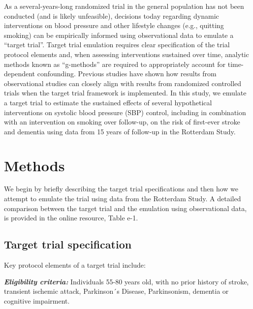 \documentclass[
]{book}
\begin{document}
As a several-years-long randomized trial in the general population has not been conducted (and is likely unfeasible), decisions today regarding dynamic interventions on blood pressure and other lifestyle changes (e.g., quitting smoking) can be empirically informed using observational data to emulate a ``target trial''\autocite{zhang2018,taubman2009,jain2016,danaei2018,garcia_aymerich2014}. Target trial emulation requires clear specification of the trial protocol elements and, when assessing interventions sustained over time, analytic methods known as ``g-methods'' are required to appropriately account for time-dependent confounding\autocite{whatif2020}. Previous studies have shown how results from observational studies can closely align with results from randomized controlled trials when the target trial framework is implemented\autocite{lodi2019,hernan2008}. In this study, we emulate a target trial to estimate the sustained effects of several hypothetical interventions on systolic blood pressure (SBP) control, including in combination with an intervention on smoking over follow-up, on the risk of first-ever stroke and dementia using data from 15 years of follow-up in the Rotterdam Study.

\hypertarget{methods-1}{%
\section{Methods}\label{methods-1}}

We begin by briefly describing the target trial specifications and then how we attempt to emulate the trial using data from the Rotterdam Study. A detailed comparison between the target trial and the emulation using observational data, is provided in the online resource, Table e-1.

\hypertarget{target-trial-specification}{%
\subsection{Target trial specification}\label{target-trial-specification}}

Key protocol elements of a target trial include:

\textbf{\emph{Eligibility criteria:}} Individuals 55-80 years old, with no prior history of stroke, transient ischemic attack, Parkinson´s Disease, Parkinsonism, dementia or cognitive impairment.
\end{document}
